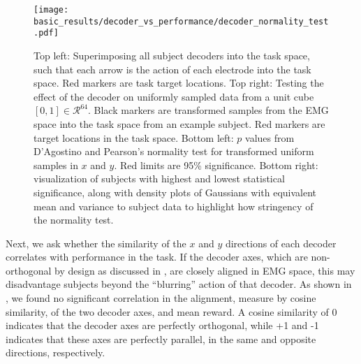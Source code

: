 \documentclass[../main.tex]{subfiles}
\begin{document}
\begin{figure}[!htb]%
    \centering
    \texttt{[image: basic\_results/decoder\_vs\_performance/decoder\_normality\_test.pdf]}
    \caption[Decoder normality test]{Top left: Superimposing all subject decoders into the task space, such that each arrow is the action of each electrode into the task space. Red markers are task target locations. Top right: Testing the effect of the decoder on uniformly sampled data from a unit cube $[0,1] \in \mathcal{R}^{64}$. Black markers are transformed samples from the EMG space into the task space from an example subject. Red markers are target locations in the task space. Bottom left: $p$ values from D'Agostino and Pearson's normality test for transformed uniform samples in $x$ and $y$. Red limits are 95\% significance. Bottom right: visualization of subjects with highest and lowest statistical significance, along with density plots of Gaussians with equivalent mean and variance to subject data to highlight how stringency of the normality test.}\label{fig:decoder_normality}
\end{figure}

Next, we ask whether the similarity of the $x$ and $y$ directions of each decoder correlates with performance in the task. If the decoder axes, which are non-orthogonal by design as discussed in , are closely aligned in EMG space, this may disadvantage subjects beyond the ``blurring'' action of that decoder. As shown in , we found no significant correlation in the alignment, measure by cosine similarity, of the two decoder axes, and mean reward. A cosine similarity of 0 indicates that the decoder axes are perfectly orthogonal, while +1 and -1 indicates that these axes are perfectly parallel, in the same and opposite directions, respectively. 


\end{document}
